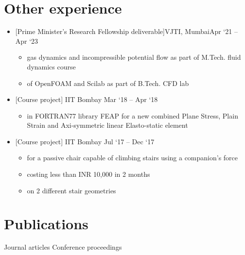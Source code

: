 \documentclass[a4paper,10pt]{article}
\newcommand{\of}{OpenFOAM}
\newcommand{\feap}{FEAP}
\begin{document}
\section{Other experience}
\begin{itemize}
	\item {}[Prime Minister's Research Fellowship deliverable]{VJTI, Mumbai}{Apr `21 -- Apr `23}
	\begin{itemize}
		\item {} gas dynamics and incompressible potential flow as part of M.Tech. fluid dynamics course
		\item {} of \of{} and Scilab as part of B.Tech. CFD lab
	\end{itemize}
	\item {}
	[Course project]
	{IIT Bombay}
	{Mar `18 -- Apr `18}
	\begin{itemize}
		\item {} in FORTRAN77 library \feap{} for a new combined Plane Stress, Plain Strain and Axi-symmetric linear Elasto-static element
	\end{itemize}
	\item {}
	[Course project]
	{IIT Bombay}
	{Jul `17 -- Dec `17}
	\begin{itemize}
		\item {} for a passive chair capable of climbing stairs using a companion's force
		\item {} costing less than INR 10,000 in 2 months
		\item {} on 2 different stair geometries
	\end{itemize}
\end{itemize}



\section{Publications}
\nocite{*}
Journal articles
\printbibliography[heading=none, type=article, resetnumbers=true]%
\noindent Conference proceedings
\printbibliography[heading=none, type=inproceedings, resetnumbers=true]
\end{document}
